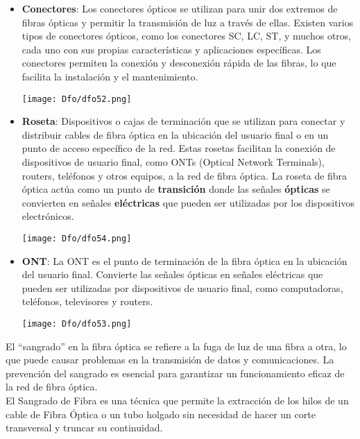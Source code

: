 \documentclass[
	12pt, %
	fleqn, %
	a4paper, %
	oneside, %
]{LegrandOrangeBook}
\begin{document}
\begin{itemize}
\item \textbf{Conectores}: Los conectores ópticos se utilizan para unir dos extremos de fibras ópticas y permitir la transmisión de luz a través de ellas. Existen varios tipos de conectores ópticos, como los conectores SC, LC, ST, y muchos otros, cada uno con sus propias características y aplicaciones específicas. Los conectores permiten la conexión y desconexión rápida de las fibras, lo que facilita la instalación y el mantenimiento.
\begin{center}
\texttt{[image: Dfo/dfo52.png]}
\end{center}
\item \textbf{Roseta}: Dispositivos o cajas de terminación que se utilizan para conectar y distribuir cables de fibra óptica en la ubicación del usuario final o en un punto de acceso específico de la red. Estas rosetas facilitan la conexión de dispositivos de usuario final, como ONTs (Optical Network Terminals), routers, teléfonos y otros equipos, a la red de fibra óptica. La roseta de fibra óptica actúa como un punto de \textbf{transición} donde las señales \textbf{ópticas} se convierten en señales \textbf{eléctricas} que pueden ser utilizadas por los dispositivos electrónicos. 
\begin{center}
\texttt{[image: Dfo/dfo54.png]}
\end{center}
\item \textbf{ONT}: La ONT es el punto de terminación de la fibra óptica en la ubicación del usuario final. Convierte las señales ópticas en señales eléctricas que pueden ser utilizadas por dispositivos de usuario final, como computadoras, teléfonos, televisores y routers.
\begin{center}
\texttt{[image: Dfo/dfo53.png]}
\end{center}
\end{itemize}
\begin{vocabulary}[Sangrado]
El ``sangrado'' en la fibra óptica se refiere a la fuga de luz de una fibra a otra, lo que puede causar problemas en la transmisión de datos y comunicaciones. La prevención del sangrado es esencial para garantizar un funcionamiento eficaz de la red de fibra óptica.\\
El Sangrado de Fibra es una técnica que permite la extracción de los hilos de un cable de Fibra Óptica o un tubo holgado sin necesidad de hacer un corte transversal y truncar su continuidad.
\end{vocabulary}
\end{document}
